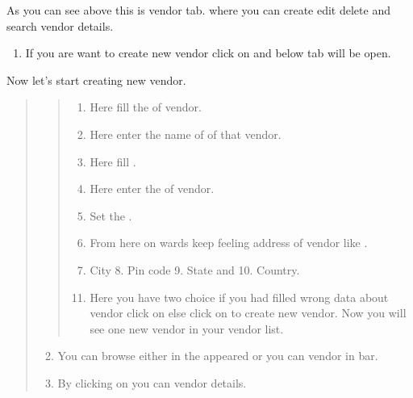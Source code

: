 \documentclass[letterpaper,10pt,english]{sphinxmanual}
\begin{document}
As you can see above this is vendor tab. where you can create edit delete and search vendor details.
\begin{enumerate}
\item {} 
If you are want to create new vendor click on  and below tab will be open.

\end{enumerate}

\begin{figure}[htbp]
\centering

\noindent{}
\end{figure}

Now let’s start creating new vendor.
\begin{quote}
\begin{quote}
\begin{enumerate}
\item {} 
Here fill the  of vendor.

\item {} 
Here enter the name of  of that vendor.

\item {} 
Here fill  .

\item {} 
Here enter the  of vendor.

\item {} 
Set the  .

\item {} 
From here on wards keep feeling address of vendor like  .

\item {} 
City  8. Pin code  9. State and  10. Country.

\end{enumerate}
\begin{enumerate}
\setcounter{enumi}{10}
\item {} 
Here you have two choice if you had filled wrong data about vendor click on  else click on  to create new vendor. Now you will see one new vendor in your vendor list.

\end{enumerate}
\end{quote}
\begin{enumerate}
\setcounter{enumi}{1}
\item {} 
You can browse  either in the appeared  or you can  vendor in  bar.

\item {} 
By clicking on  you can  vendor details.

\end{enumerate}
\end{quote}
\end{document}
